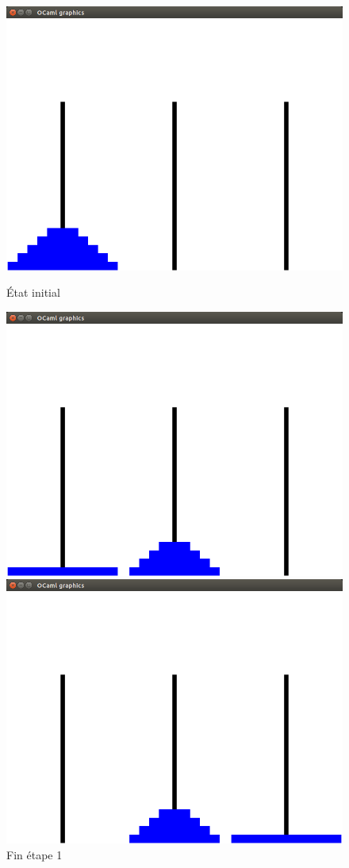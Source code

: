 \documentclass[a4paper, 11pt]{article}%
\begin{document}
		\begin{figure}[!h]
			  \includegraphics[width=\linewidth]{hanoi_start.png}
			  \caption{État initial}\label{fig:hanoi_start}
			\endminipage\hfill
			  \includegraphics[width=\linewidth]{hanoi_mid1.png}
			  \caption{Fin étape 1}\label{fig:hanoi_mid1}
			\endminipage\hfill
			  \includegraphics[width=\linewidth]{hanoi_mid2.png}

\end{figure}
\end{document}

